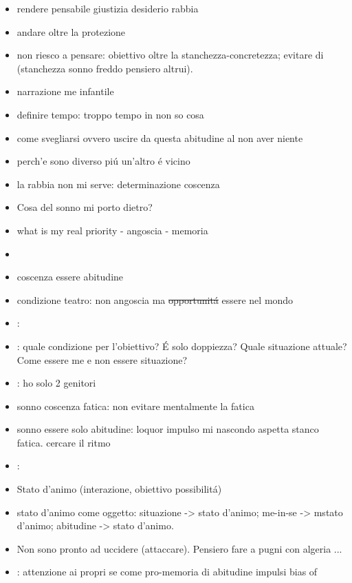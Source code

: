 \begin{itemize}
\item rendere pensabile giustizia desiderio rabbia
\item andare oltre la protezione
\item non riesco a pensare: obiettivo oltre la stanchezza-concretezza; evitare di  (stanchezza sonno freddo pensiero altrui).
\item narrazione me infantile
\item definire tempo: troppo tempo in non so cosa
\item come svegliarsi ovvero uscire da questa abitudine al non aver niente
\item perch'e sono diverso pi\'u un'altro \'e vicino
\item la rabbia non mi serve: determinazione coscenza 
\item Cosa del sonno mi porto dietro?
\item what is my real priority - angoscia - memoria
\item {}
\item coscenza essere abitudine
\item condizione teatro: non angoscia ma \sout{opportunit\'a} essere nel mondo
\item {}:
\item {}: quale condizione per l'obiettivo? \'E solo doppiezza? Quale situazione attuale? Come essere me e non essere situazione?
\item {}: ho solo 2 genitori
\item sonno coscenza fatica: non evitare mentalmente la fatica
\item sonno essere solo abitudine: loquor impulso mi nascondo aspetta stanco fatica. cercare il ritmo
\item {}: 
\item Stato d'animo (interazione, obiettivo possibilit\'a)
\item  stato d'animo come oggetto: situazione -> stato d'animo; me-in-se -> mstato d'animo; abitudine -> stato d'animo.
\item Non sono pronto ad uccidere (attaccare).
Pensiero fare a pugni con algeria ...
\item {}: attenzione ai propri se come pro-memoria di abitudine impulsi bias of

\end{itemize}
